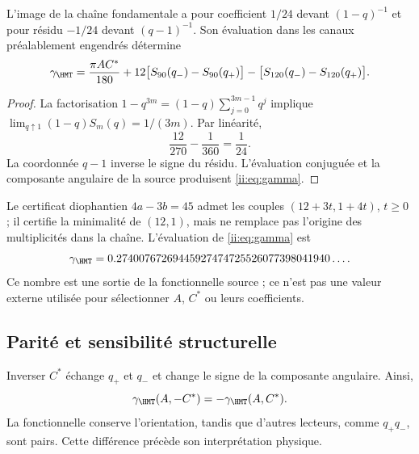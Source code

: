 \begin{theorem}
L'image de la chaîne fondamentale a pour coefficient $1/24$
devant $(1-q)^{-1}$ et pour résidu $-1/24$ devant $(q-1)^{-1}$.
Son évaluation dans les canaux préalablement engendrés détermine
\begin{equation}
\gamma_{\HMT}=
\frac{\pi AC^*}{180}
+12\bigl[S_{90}(q_-)-S_{90}(q_+)\bigr]
-\bigl[S_{120}(q_-)-S_{120}(q_+)\bigr].
\label{ii:eq:gamma}
\end{equation}
\end{theorem}
\begin{proof}
La factorisation $1-q^{3m}=(1-q)\sum_{j=0}^{3m-1}q^j$ implique
$\lim_{q\uparrow1}(1-q)S_m(q)=1/(3m)$. Par linéarité,
\[
\frac{12}{270}-\frac1{360}=\frac1{24}.
\]
La coordonnée $q-1$ inverse le signe du résidu.
L'évaluation conjuguée et la composante angulaire de la source
produisent \eqref{ii:eq:gamma}.
\end{proof}

Le certificat diophantien $4a-3b=45$ admet les couples
$(12+3t,1+4t)$, $t\ge0$ ; il certifie la minimalité de $(12,1)$,
mais ne remplace pas l'origine des multiplicités dans la chaîne.
L'évaluation de \eqref{ii:eq:gamma} est
\[
\gamma_{\HMT}
=0.27400767269445927474725526077398041940\ldots.
\]
Ce nombre est une sortie de la fonctionnelle source ; ce n'est pas une valeur externe
utilisée pour sélectionner $A$, $C^*$ ou leurs coefficients.

\subsection{Parité et sensibilité structurelle}
Inverser $C^*$ échange $q_+$ et $q_-$ et change le signe
de la composante angulaire. Ainsi,
\[
\gamma_{\HMT}(A,-C^*)=-\gamma_{\HMT}(A,C^*).
\]
La fonctionnelle conserve l'orientation, tandis que d'autres lecteurs,
comme $q_+q_-$, sont pairs. Cette différence précède son interprétation physique.
